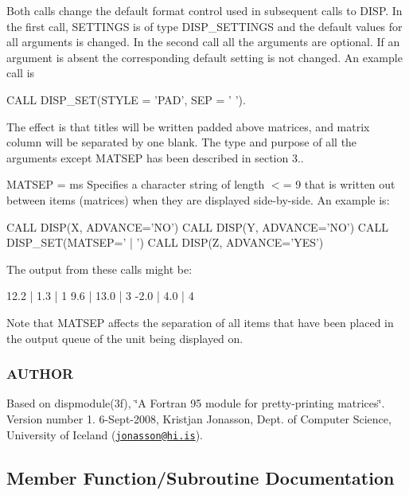 Both calls change the default format control used in subsequent calls to D\+I\+SP. In the first call, S\+E\+T\+T\+I\+N\+GS is of type D\+I\+S\+P\+\_\+\+S\+E\+T\+T\+I\+N\+GS and the default values for all arguments is changed. In the second call all the arguments are optional. If an argument is absent the corresponding default setting is not changed. An example call is \begin{DoxyVerb}  CALL DISP_SET(STYLE = 'PAD', SEP = ' ').
\end{DoxyVerb}


The effect is that titles will be written padded above matrices, and matrix column will be separated by one blank. The type and purpose of all the arguments except M\+A\+T\+S\+EP has been described in section 3..

M\+A\+T\+S\+EP = ms Specifies a character string of length $<$= 9 that is written out between items (matrices) when they are displayed side-\/by-\/side. An example is\+: \begin{DoxyVerb} CALL DISP(X, ADVANCE='NO')
 CALL DISP(Y, ADVANCE='NO')
 CALL DISP_SET(MATSEP=' | ')
 CALL DISP(Z, ADVANCE='YES')
\end{DoxyVerb}


The output from these calls might be\+: \begin{DoxyVerb} 12.2 |  1.3 | 1
  9.6 | 13.0 | 3
 -2.0 |  4.0 | 4
\end{DoxyVerb}


Note that M\+A\+T\+S\+EP affects the separation of all items that have been placed in the output queue of the unit being displayed on. \subsubsection*{A\+U\+T\+H\+OR}

Based on dispmodule(3f), \char`\"{}\+A Fortran 95 module for pretty-\/printing matrices\char`\"{}. Version number 1. 6-\/\+Sept-\/2008, Kristjan Jonasson, Dept. of Computer Science, University of Iceland (\href{mailto:jonasson@hi.is}{\tt jonasson@hi.\+is}). 

\subsection{Member Function/\+Subroutine Documentation}
\mbox{\label{interfacem__display_1_1disp__set_a763734e87c92afbf37d059cea632d541}} 
